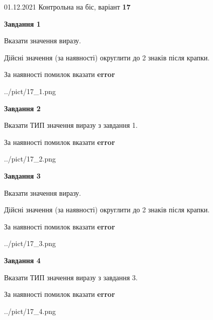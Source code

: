 \documentclass[11pt, ukrainian]{article}
\begin{document}
{01.12.2021 Контрольна на біс, варіант  \No \textbf { 17 }\par}
{
\begin {large}
{\begin {center}\textbf{Завдання 1}\end {center}}\par
Вказати значення виразу. \par
Дійсні значення (за наявності) округлити до 2 знаків після крапки. \par
За наявності помилок вказати \textbf{error}

\begin{center}
	{../pict/17_1.png}
\end{center}
\newpage

{\begin {center}\textbf{Завдання 2}\end {center}}\par
Вказати ТИП значення виразу з завдання 1. \par
За наявності помилок вказати \textbf{error}

\begin{center}
	{../pict/17_2.png}
\end{center}
\newpage

{\begin {center}\textbf{Завдання 3}\end {center}}\par
Вказати значення виразу. \par
Дійсні значення (за наявності) округлити до 2 знаків після крапки. \par
За наявності помилок вказати \textbf{error}

\begin{center}
	{../pict/17_3.png}
\end{center}
\newpage

{\begin {center}\textbf{Завдання 4}\end {center}}\par
Вказати ТИП значення виразу з завдання 3. \par
За наявності помилок вказати \textbf{error}

\begin{center}
	{../pict/17_4.png}
\end{center}
\newpage


\end{large}}
\end{document}
